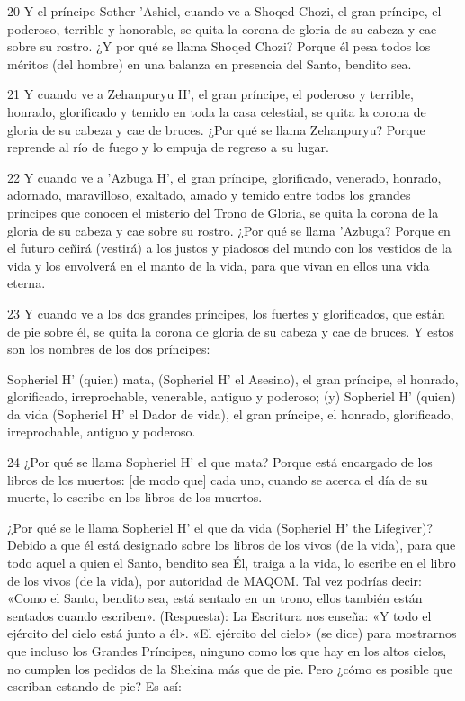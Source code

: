 \par 20 Y el príncipe Sother 'Ashiel, cuando ve a Shoqed Chozi, el gran príncipe, el poderoso, terrible y honorable, se quita la corona de gloria de su cabeza y cae sobre su rostro. ¿Y por qué se llama Shoqed Chozi? Porque él pesa todos los méritos (del hombre) en una balanza en presencia del Santo, bendito sea.

\par 21 Y cuando ve a Zehanpuryu H', el gran príncipe, el poderoso y terrible, honrado, glorificado y temido en toda la casa celestial, se quita la corona de gloria de su cabeza y cae de bruces. ¿Por qué se llama Zehanpuryu? Porque reprende al río de fuego y lo empuja de regreso a su lugar.

\par 22 Y cuando ve a 'Azbuga H', el gran príncipe, glorificado, venerado, honrado, adornado, maravilloso, exaltado, amado y temido entre todos los grandes príncipes que conocen el misterio del Trono de Gloria, se quita la corona de la gloria de su cabeza y cae sobre su rostro. ¿Por qué se llama 'Azbuga? Porque en el futuro ceñirá (vestirá) a los justos y piadosos del mundo con los vestidos de la vida y los envolverá en el manto de la vida, para que vivan en ellos una vida eterna.

\par 23 Y cuando ve a los dos grandes príncipes, los fuertes y glorificados, que están de pie sobre él, se quita la corona de gloria de su cabeza y cae de bruces. Y estos son los nombres de los dos príncipes:

\par Sopheriel H' (quien) mata, (Sopheriel H' el Asesino), el gran príncipe, el honrado, glorificado, irreprochable, venerable, antiguo y poderoso; (y) Sopheriel H' (quien) da vida (Sopheriel H' el Dador de vida), el gran príncipe, el honrado, glorificado, irreprochable, antiguo y poderoso.

\par 24 ¿Por qué se llama Sopheriel H' el que mata? Porque está encargado de los libros de los muertos: [de modo que] cada uno, cuando se acerca el día de su muerte, lo escribe en los libros de los muertos.

\par ¿Por qué se le llama Sopheriel H' el que da vida (Sopheriel H' the Lifegiver)? Debido a que él está designado sobre los libros de los vivos (de la vida), para que todo aquel a quien el Santo, bendito sea Él, traiga a la vida, lo escribe en el libro de los vivos (de la vida), por autoridad de MAQOM. Tal vez podrías decir: «Como el Santo, bendito sea, está sentado en un trono, ellos también están sentados cuando escriben». (Respuesta): La Escritura nos enseña: «Y todo el ejército del cielo está junto a él». «El ejército del cielo» (se dice) para mostrarnos que incluso los Grandes Príncipes, ninguno como los que hay en los altos cielos, no cumplen los pedidos de la Shekina más que de pie. Pero ¿cómo es posible que escriban estando de pie? Es así:

